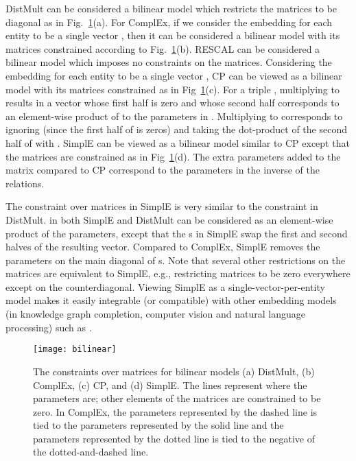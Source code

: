 \documentclass{article}
\begin{document}
DistMult can be considered a bilinear model which restricts the  matrices to be diagonal as in Fig.~\ref{bilinear-fig}(a). For ComplEx, if we consider the embedding for each entity  to be a single vector , then it can be considered a bilinear model with its  matrices constrained according to Fig.~\ref{bilinear-fig}(b). RESCAL can be considered a bilinear model which imposes no constraints on the  matrices. Considering the embedding for each entity  to be a single vector , CP can be viewed as a bilinear model with its  matrices constrained as in Fig~\ref{bilinear-fig}(c). For a triple , multiplying  to  results in a vector  whose first half is zero and whose second half corresponds to an element-wise product of  to the parameters in . Multiplying  to  corresponds to ignoring  (since the first half of  is zeros) and taking the dot-product of the second half of  with . SimplE can be viewed as a bilinear model similar to CP except that the  matrices are constrained as in Fig~\ref{bilinear-fig}(d). The extra parameters added to the matrix compared to CP correspond to the parameters in the inverse of the relations. 

The constraint over  matrices in SimplE is very similar to the constraint in DistMult.  in both SimplE and DistMult can be considered as an element-wise product of the parameters, except that the s in SimplE swap the first and second halves of the resulting vector.  
Compared to ComplEx, SimplE removes the parameters on the main diagonal of s. Note that several other restrictions on the  matrices are equivalent to SimplE, e.g., restricting  matrices to be zero everywhere except on the counterdiagonal. Viewing SimplE as a single-vector-per-entity model makes it easily integrable (or compatible) with other embedding models (in knowledge graph completion, computer vision and natural language processing) such as \cite{santoro2017simple,zhang2017visual,schlichtkrull2018modeling}.

\begin{figure}[t]
\centering
\texttt{[image: bilinear]}
\caption{The constraints over  matrices for bilinear models (a) DistMult, (b) ComplEx, (c) CP, and (d) SimplE. The lines represent where the parameters are; other elements of the matrices are constrained to be zero. In ComplEx, the parameters represented by the dashed line is tied to the parameters represented by the solid line and the parameters represented by the dotted line is tied to the negative of the dotted-and-dashed line.}
\label{bilinear-fig}
\end{figure}
\end{document}
